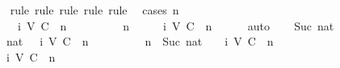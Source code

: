 \begin{isabellebody}
%
\isadelimproof
\ \ %
\endisadelimproof
%
\isatagproof
{}\isamarkupfalse%
\ {\isacharparenleft}rule{\isacharcomma}\ rule{\isacharcomma}\ rule{\isacharcomma}\ rule{\isacharcomma}\ rule{\isacharparenright}\ \isanewline
{}\isamarkupfalse%
\ {\isacharparenleft}cases\ n{\isacharparenright}\isanewline
\ \ \isamarkupfalse%
\ {}\isanewline
\ \ \isamarkupfalse%
\ {\isachardoublequoteopen}{\isasymAnd}{\isasymsigma}\ {\isasymsigma}{\isacharprime}{\isachardot}\ {\isasymsigma}{\isacharprime}\ {\isasymin}\ {\isasymSigma}{\isacharunderscore}i\ {\isacharparenleft}V{\isacharcomma}\ C{\isacharcomma}\ {\isasymepsilon}{\isacharparenright}\ n\ {\isasymLongrightarrow}\ {\isasymsigma}\ {\isasymsubseteq}\ {\isasymsigma}{\isacharprime}\ {\isasymLongrightarrow}\ {\isasymsigma}\ {\isasymin}\ {\isasymSigma}\ {\isasymLongrightarrow}\ n\ {\isacharequal}\ {}\ {\isasymLongrightarrow}\ {\isasymsigma}\ {\isasymin}\ {\isasymSigma}{\isacharunderscore}i\ {\isacharparenleft}V{\isacharcomma}\ C{\isacharcomma}\ {\isasymepsilon}{\isacharparenright}\ n{\isachardoublequoteclose}\isanewline
\ \ \ \ \isamarkupfalse%
\ auto\isanewline
{}\isamarkupfalse%
\isanewline
\ \ \isamarkupfalse%
\ {\isacharparenleft}Suc\ nat{\isacharparenright}\isanewline
\ \ \isamarkupfalse%
\ {\isachardoublequoteopen}{\isasymAnd}{\isasymsigma}\ {\isasymsigma}{\isacharprime}\ nat{\isachardot}\ {\isasymsigma}{\isacharprime}\ {\isasymin}\ {\isasymSigma}{\isacharunderscore}i\ {\isacharparenleft}V{\isacharcomma}\ C{\isacharcomma}\ {\isasymepsilon}{\isacharparenright}\ n\ {\isasymLongrightarrow}\ {\isasymsigma}\ {\isasymsubseteq}\ {\isasymsigma}{\isacharprime}\ {\isasymLongrightarrow}\ {\isasymsigma}\ {\isasymin}\ {\isasymSigma}\ {\isasymLongrightarrow}\ n\ {\isacharequal}\ Suc\ nat\ {\isasymLongrightarrow}\ {\isasymsigma}\ {\isasymin}\ {\isasymSigma}{\isacharunderscore}i\ {\isacharparenleft}V{\isacharcomma}\ C{\isacharcomma}\ {\isasymepsilon}{\isacharparenright}\ n{\isachardoublequoteclose}\isanewline
\ \ \isamarkupfalse%
\ {\isacharminus}\isanewline
\ \ \isamarkupfalse%
\ {\isasymsigma}\ {\isasymsigma}{\isacharprime}\isanewline
\ \ \isamarkupfalse%
\ {\isachardoublequoteopen}{\isasymsigma}{\isacharprime}\ {\isasymin}\ {\isasymSigma}{\isacharunderscore}i\ {\isacharparenleft}V{\isacharcomma}\ C{\isacharcomma}\ {\isasymepsilon}{\isacharparenright}\ n{\isachardoublequoteclose}\isanewline
\ \ \ {\isachardoublequoteopen}{\isasymsigma}\ {\isasymsubseteq}\ {\isasymsigma}{\isacharprime}{\isachardoublequoteclose}\ \isanewline

\end{isabellebody}
